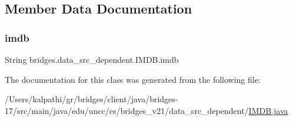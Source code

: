 \subsection{Member Data Documentation}
\mbox{\label{classbridges_1_1data__src__dependent_1_1_i_m_d_b_a2913407abe6019a396d4a2ac086283df}} 
\subsubsection{\texorpdfstring{imdb}{imdb}}
{\footnotesize\ttfamily String bridges.\+data\+\_\+src\+\_\+dependent.\+I\+M\+D\+B.\+imdb\hspace{0.3cm}{\ttfamily [protected]}}



The documentation for this class was generated from the following file\+:\begin{DoxyCompactItemize}
\item 
/\+Users/kalpathi/gr/bridges/client/java/bridges-\/17/src/main/java/edu/uncc/cs/bridges\+\_\+v21/data\+\_\+src\+\_\+dependent/\mbox{\hyperlink{_i_m_d_b_8java}{I\+M\+D\+B.\+java}}\end{DoxyCompactItemize}
